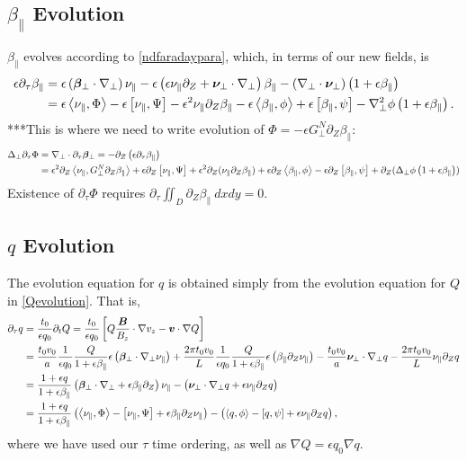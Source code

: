 \documentclass{article}
\newcommand{\para}{\parallel}
\newcommand{\ep}{\epsilon}
\newcommand{\np}{\nabla_\perp}
\newcommand{\lap}{\Delta_\perp}
\newcommand{\p}{\partial}
\newcommand{\fr}{\frac{1+\ep q}{1+\ep\beta_\para}}
\newcommand{\GN}{G_\perp^N}
\newcommand{\pth} [1] {\left( #1 \right) }
\newcommand{\br} [1] {\left[ #1 \right] }
\begin{document}
\subsection{$\beta_\para$ Evolution }
$\beta_\para$ evolves according to \eqref{ndfaradaypara}, which, in terms of our new fields, is 
\begin{align} \label{betaparaevolution} 
    \ep\p_\tau\beta_\para &= \ep\pth{\bm{\beta}_\perp\cdot\np} \nu_\para - \ep\pth{\ep\nu_\para\p_Z + \bm{\nu}_\perp\cdot\np} \beta_\para - \pth{\np\cdot\bm{\nu}_\perp}\pth{1+\ep \beta_\para} \nonumber\\ 
        &= \ep\Braket{\nu_\para, \Phi} - \ep\br{\nu_\para, \Psi} - \ep^2\nu_\para\p_Z\beta_\para - \ep\Braket{\beta_\para, \phi} + \ep\br{\beta_\para, \psi} - \np^2\phi\pth{1+\ep\beta_\para}.
\end{align}
***This is where we need to write evolution of $\Phi = -\ep\GN\p_Z\beta_\para$: 
\begin{align*}
    \lap\p_\tau \Phi &= \np\cdot\p_\tau \bm{\beta}_\perp = -\p_Z \pth{\ep\p_\tau \beta_\para} \\ 
    &= \ep^2\p_Z \Braket{\nu_\para,\GN\p_Z\beta_\para} + \ep\p_Z\br{\nu_\para,\Psi} + \ep^2\p_Z (\nu_\para\p_Z\beta_\para) + \ep\p_Z \Braket{\beta_\para, \phi} - \ep\p_Z \br{\beta_\para, \psi} + \p_Z(\lap\phi\pth{1+\ep\beta_\para})
\end{align*}
Existence of $\p_\tau\Phi$ requires $\p_\tau \iint_D \p_Z\beta_\para\ dxdy = 0$. 


\subsection{$q$ Evolution }
The evolution equation for $q$ is obtained simply from the evolution equation for $Q$ in \eqref{Qevolution}. That is, 
\begin{align} \label{qevolution} 
    \p_\tau q &= \frac{t_0}{\ep q_0} \p_tQ = \frac{t_0}{\ep q_0} \br{Q\frac{\bm{B}}{B_z} \cdot\nabla v_z - \bm{v}\cdot\nabla Q} \nonumber\\ 
    &= \frac{t_0v_0}{a} \frac{1}{\ep q_0} \frac{Q}{1+\ep\beta_\para} \ep\pth{\bm{\beta}_\perp \cdot \np\nu_\para} 
    + \frac{2\pi t_0v_0}{L} \frac{1}{\ep q_0} \frac{Q}{1+\ep\beta_\para} \ep\pth{\beta_\para \p_Z\nu_\para} 
    - \frac{t_0v_0}{a} \bm{\nu}_\perp \cdot \np q - \frac{2\pi t_0v_0}{L} \nu_\para \p_Z q \nonumber\\ 
        &= \fr \pth{\bm{\beta}_\perp \cdot \np + \ep \beta_\para \p_Z} \nu_\para 
        - \pth{\bm{\nu}_\perp \cdot \np q + \ep\nu_\para\p_Z q} \nonumber\\ 
        &= \fr \pth{\Braket{\nu_\para, \Phi} - \br{\nu_\para, \Psi} + \ep\beta_\para\p_Z\nu_\para} - \pth{\Braket{q, \phi} - \br{q, \psi} + \ep\nu_\para\p_Zq}, 
\end{align}
where we have used our $\tau$ time ordering, as well as $\nabla Q = \ep q_0 \nabla q$.
\end{document}
